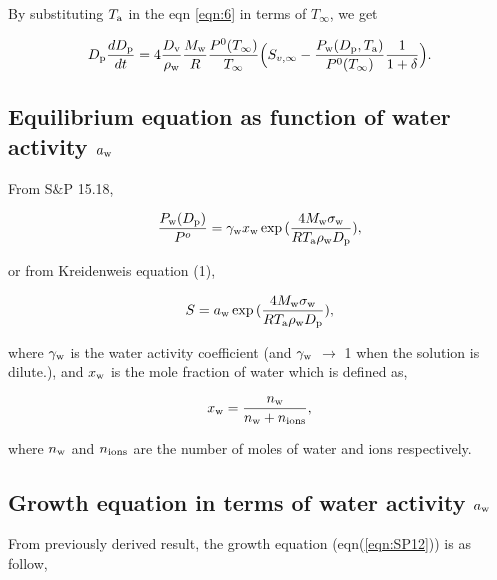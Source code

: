 \documentclass[12pt]{article}
\begin{document}
By substituting $T_{\rm a}$ in the eqn \ref{eqn:6} in terms of $T_{\infty}$, we get 

\begin{equation}\label{eqn:SP12}
D_{\rm p}\frac{dD_{\rm p}}{dt}=4 \frac{D_{\rm v}} {\rho_{\rm w}} \frac{M_{\rm w}}{R} \frac{P^{\rm 0}(T_{\infty})} {T_{\infty}} \Big(S_{v, \infty} - \frac{P_{\rm w}(D_{\rm p}, T_{\rm a})}{P^{\rm 0}(T_{\infty})} \frac{1}{1+\delta}\Big).
\end{equation}

 
\subsection{Equilibrium equation as function of water activity $a_{\rm w}$}

From S$\&$P 15.18, 

\begin{equation}\label{eqn:8}
\frac{P_{\rm w}(D_{\rm p})}{P^{o}}=\gamma_{\rm w}x_{\rm w}\exp{(\frac{4 M_{\rm w} \sigma_{\rm w}}{R T_{\rm a} \rho_{\rm w} D_{\rm p}})},
\end{equation}

or from Kreidenweis equation (1),

\begin{equation}\label{eqn:9}
S=a_{\rm w}\exp{(\frac{4 M_{\rm w} \sigma_{\rm w}}{R T_{\rm a} \rho_{\rm w}D_{\rm p}})}, 
\end{equation}

where $\gamma_{\rm w}$ is the water activity coefficient (and $\gamma_{\rm w}$ $\rightarrow$ 1 when the solution is dilute.), and $x_{\rm w}$ is the mole fraction of water which is defined as,

\begin{equation}\label{eqn:10}
x_{\rm w}=\frac{n_{\rm w}}{n_{\rm w}+n_{\rm ions}},
\end{equation}

where $n_{\rm w}$ and $n_{\rm ions}$ are the number of moles of water and ions respectively.


\subsection{Growth equation in terms of water activity $a_{\rm w}$}

From previously derived result, the growth equation (eqn(\ref{eqn:SP12})) is as follow,
\end{document}
